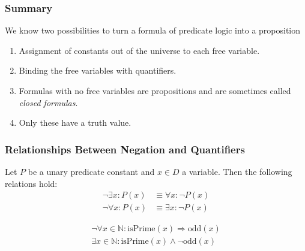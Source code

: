 \documentclass{beamer}
\theoremstyle{remark}
\begin{document}
\begin{frame}
 \frametitle{Summary}
 
 We know two possibilities to turn a formula of predicate logic into a proposition 
\begin{enumerate}
 	\item Assignment of constants out of the universe to each free variable.
	\item Binding the free variables with quantifiers.
	\pause
	\item Formulas with no free variables are propositions and are sometimes called {\em closed formulas}.
	\item Only these have a truth value.
\end{enumerate}
\end{frame}

\begin{frame}
	\frametitle{Relationships Between Negation and Quantifiers}
	
	\begin{theorem}
		Let $P$ be a unary predicate constant and $x \in D$ a variable. Then the following relations hold:
		\begin{align*}
			\lnot \exists x: P(x) & \equiv \forall x: \lnot P(x) \\
			\lnot \forall x: P(x) & \equiv \exists x: \lnot P(x)
		\end{align*}
	\end{theorem}
	
	\pause
	
	\begin{example}
		\begin{align*}
			\lnot \forall x \in \mathbb{N}: \text{isPrime}(x) \Rightarrow \text{odd}(x) \\
			\exists x \in \mathbb{N}: \text{isPrime}(x) \land \lnot \text{odd}(x)
		\end{align*}
	\end{example}
\end{frame}
\end{document}
